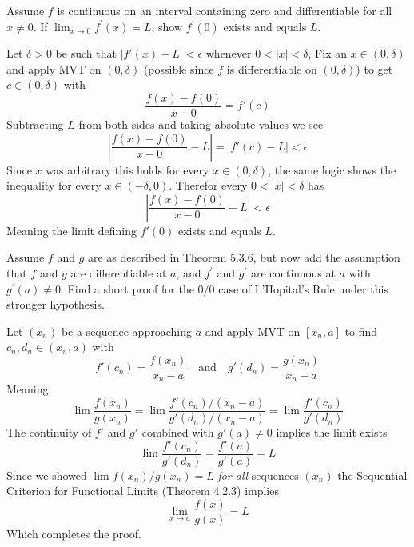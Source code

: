 \begin{exercise}
  Assume $f$ is continuous on an interval containing zero and differentiable for all $x \neq 0$. If $\lim _{x \rightarrow 0} f^{\prime}(x)=L$, show $f^{\prime}(0)$ exists and equals $L$.
\end{exercise}
\begin{solution}
  Let $\delta > 0$ be such that $|f'(x) - L| < \epsilon$ whenever $0<|x|<\delta$,
  Fix an $x \in (0,\delta)$ and apply MVT on $(0,\delta)$ (possible since $f$ is differentiable on $(0,\delta)$) to get $c \in (0,\delta)$ with
  $$
  \frac{f(x) - f(0)}{x - 0} = f'(c)
  $$
  Subtracting $L$ from both sides and taking absolute values we see
  $$
  \left|\frac{f(x) - f(0)}{x - 0} - L\right| = \left|f'(c) - L\right| < \epsilon
  $$
  Since $x$ was arbitrary this holds for every $x \in (0,\delta)$, the same logic shows the inequality for every $x \in (-\delta,0)$. Therefor every $0 < |x| < \delta$ has
  $$
  \left|\frac{f(x) - f(0)}{x - 0} - L\right| < \epsilon
  $$
  Meaning the limit defining $f'(0)$ exists and equals $L$.
\end{solution}

\begin{exercise}
  Assume $f$ and $g$ are as described in Theorem 5.3.6, but now add the assumption that $f$ and $g$ are differentiable at $a$, and $f^{\prime}$ and $g^{\prime}$ are continuous at $a$ with $g^{\prime}(a) \neq 0$. Find a short proof for the $0 / 0$ case of L'Hopital's Rule under this stronger hypothesis.
\end{exercise}
\begin{solution}
  Let $(x_n)$ be a sequence approaching $a$ and apply MVT on $[x_n,a]$ to find $c_n,d_n \in (x_n,a)$ with
  $$
  f'(c_n) = \frac{f(x_n)}{x_n - a} \quad\text{and}\quad g'(d_n) = \frac{g(x_n)}{x_n - a}
  $$
  Meaning
  $$
  \lim \frac{f(x_n)}{g(x_n)} = \lim \frac{f'(c_n)/(x_n-a)}{g'(d_n)/(x_n-a)} = \lim \frac{f'(c_n)}{g'(d_n)}
  $$
  The continuity of $f'$ and $g'$ combined with $g'(a) \ne 0$ implies the limit exists
  $$
  \lim \frac{f'(c_n)}{g'(d_n)} = \frac{f'(a)}{g'(a)} = L
  $$
  Since we showed $\lim f(x_n)/g(x_n) = L$ \emph{for all} sequences $(x_n)$ the Sequential Criterion for Functional Limits (Theorem 4.2.3) implies
  $$
  \lim_{x \to a} \frac{f(x)}{g(x)} = L
  $$
  Which completes the proof.
\end{solution}

